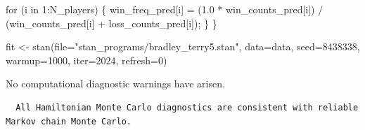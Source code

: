 \documentclass[
  letterpaper,
  DIV=11,
  numbers=noendperiod]{scrartcl}
\newenvironment{Shaded}{\begin{snugshade}}{\end{snugshade}}
\newcommand{\AttributeTok}[1]{\textcolor[rgb]{0.40,0.45,0.13}{#1}}
\newcommand{\ConstantTok}[1]{\textcolor[rgb]{0.56,0.35,0.01}{#1}}
\newcommand{\ControlFlowTok}[1]{\textcolor[rgb]{0.00,0.23,0.31}{#1}}
\newcommand{\DecValTok}[1]{\textcolor[rgb]{0.68,0.00,0.00}{#1}}
\newcommand{\FloatTok}[1]{\textcolor[rgb]{0.68,0.00,0.00}{#1}}
\newcommand{\FunctionTok}[1]{\textcolor[rgb]{0.28,0.35,0.67}{#1}}
\newcommand{\NormalTok}[1]{\textcolor[rgb]{0.00,0.23,0.31}{#1}}
\newcommand{\OtherTok}[1]{\textcolor[rgb]{0.00,0.23,0.31}{#1}}
\newcommand{\SpecialCharTok}[1]{\textcolor[rgb]{0.37,0.37,0.37}{#1}}
\newcommand{\StringTok}[1]{\textcolor[rgb]{0.13,0.47,0.30}{#1}}
\begin{document}
\begin{codelisting}
\begin{Shaded}
\begin{Highlighting}[]
  \ControlFlowTok{for}\NormalTok{ (i }\ControlFlowTok{in} \DecValTok{1}\NormalTok{:N\_players) \{}
\NormalTok{    win\_freq\_pred[i] =   (}\FloatTok{1.0}\NormalTok{ * win\_counts\_pred[i])}
\NormalTok{                       / (win\_counts\_pred[i] + loss\_counts\_pred[i]);}
\NormalTok{  \}}
\NormalTok{\}}
\end{Highlighting}
\end{Shaded}

\end{codelisting}

\begin{Shaded}
\begin{Highlighting}[]
\NormalTok{fit }\OtherTok{\textless{}{-}} \FunctionTok{stan}\NormalTok{(}\AttributeTok{file=}\StringTok{"stan\_programs/bradley\_terry5.stan"}\NormalTok{,}
            \AttributeTok{data=}\NormalTok{data, }\AttributeTok{seed=}\DecValTok{8438338}\NormalTok{,}
            \AttributeTok{warmup=}\DecValTok{1000}\NormalTok{, }\AttributeTok{iter=}\DecValTok{2024}\NormalTok{, }\AttributeTok{refresh=}\DecValTok{0}\NormalTok{)}
\end{Highlighting}
\end{Shaded}

No computational diagnostic warnings have arisen.

\begin{Shaded}
\end{Shaded}

\begin{verbatim}
  All Hamiltonian Monte Carlo diagnostics are consistent with reliable
Markov chain Monte Carlo.
\end{verbatim}

\begin{Shaded}
\end{Shaded}
\end{document}
